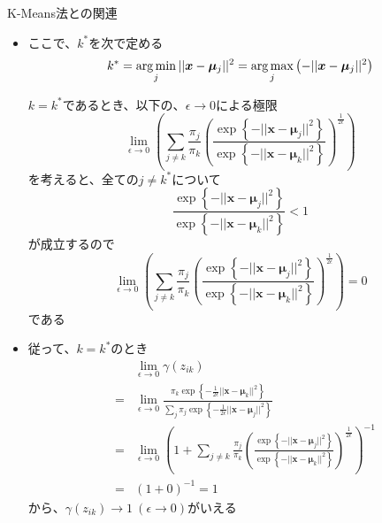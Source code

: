 \documentclass[dvipdfmx,notheorems,t]{beamer}
\begin{document}
\begin{frame}{K-Means法との関連}
\begin{itemize}
\begin{itemize}
		\item ここで、$k^*$を次で定める
		\begin{equation}
			k^* = \operatorname*{arg\,min}_j || \bm{x} - \bm{\mu}_j ||^2 = \operatorname*{arg\,max}_j \left( - || \bm{x} - \bm{\mu}_j ||^2 \right)
		\end{equation}
		
		$k = k^*$であるとき、以下の、$\epsilon \to 0$による極限
		\begin{equation}
			\lim_{\epsilon \to 0} \left( \sum_{j \neq k} \frac{\pi_j}{\pi_k} \left( \frac{\exp \left\{ - || \bm{x} - \bm{\mu}_j ||^2 \right\}}{\exp \left\{ - || \bm{x} - \bm{\mu}_k ||^2 \right\}} \right)^{\frac{1}{2\epsilon}} \right)
		\end{equation}
		を考えると、全ての$j \neq k^*$について
		\begin{equation}
			\frac{\exp \left\{ - || \bm{x} - \bm{\mu}_j ||^2 \right\}}{\exp \left\{ - || \bm{x} - \bm{\mu}_k ||^2 \right\}} < 1
		\end{equation}
		が成立するので
		\begin{equation}
			\lim_{\epsilon \to 0} \left( \sum_{j \neq k} \frac{\pi_j}{\pi_k} \left( \frac{\exp \left\{ - || \bm{x} - \bm{\mu}_j ||^2 \right\}}{\exp \left\{ - || \bm{x} - \bm{\mu}_k ||^2 \right\}} \right)^{\frac{1}{2\epsilon}} \right) = 0
		\end{equation}
		である
		\newline
		
		\item 従って、$k = k^*$のとき
		\begin{eqnarray}
			&& \lim_{\epsilon \to 0} \gamma(z_{ik}) \nonumber \\
			&=& \lim_{\epsilon \to 0} \frac{\pi_k \exp \left\{ -\frac{1}{2\epsilon} || \bm{x} - \bm{\mu}_k ||^2 \right\}}{\sum_j \pi_j \exp \left\{ -\frac{1}{2\epsilon} || \bm{x} - \bm{\mu}_j ||^2 \right\}} \nonumber \\
			&=& \lim_{\epsilon \to 0} \left( 1 + \sum_{j \neq k} \frac{\pi_j}{\pi_k} \left( \frac{\exp \left\{ - || \bm{x} - \bm{\mu}_j ||^2 \right\}}{\exp \left\{ - || \bm{x} - \bm{\mu}_k ||^2 \right\}} \right)^{\frac{1}{2\epsilon}} \right)^{-1} \nonumber \\
			&=& (1 + 0)^{-1} = 1
		\end{eqnarray}
		から、$\gamma(z_{ik}) \to 1 \ (\epsilon \to 0)$がいえる
		\newline
		

\end{itemize}
\end{itemize}
\end{frame}
\end{document}
